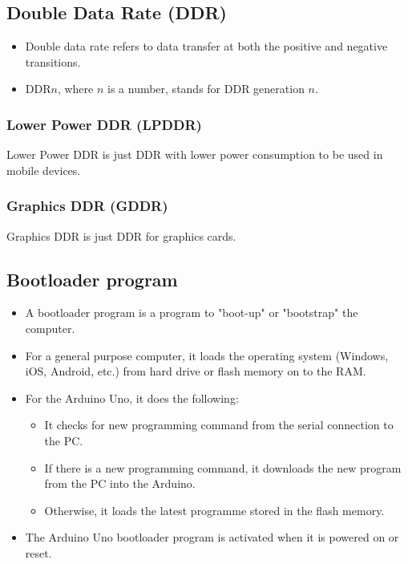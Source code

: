 \documentclass[11pt]{article}
\begin{document}
\subsection{Double Data Rate (DDR)}
\label{sec:org00e4ebd}
\begin{itemize}
\item Double data rate refers to data transfer at both the positive and negative transitions.
\item DDR\(n\), where \(n\) is a number, stands for DDR generation \(n\).
\end{itemize}

\subsubsection{Lower Power DDR (LPDDR)}
\label{sec:org096c0db}
Lower Power DDR is just DDR with lower power consumption to be used in mobile devices.

\subsubsection{Graphics DDR (GDDR)}
\label{sec:orgfc76842}
Graphics DDR is just DDR for graphics cards.

\subsection{Bootloader program}
\label{sec:org1b30d09}
\begin{itemize}
\item A bootloader program is a program to "boot-up" or "bootstrap" the computer.
\item For a general purpose computer, it loads the operating system (Windows, iOS, Android, etc.) from hard drive or flash memory on to the RAM.
\item For the Arduino Uno, it does the following:
\begin{itemize}
\item It checks for new programming command from the serial connection to the PC.
\item If there is a new programming command, it downloads the new program from the PC into the Arduino.
\item Otherwise, it loads the latest programme stored in the flash memory.
\end{itemize}
\item The Arduino Uno bootloader program is activated when it is powered on or reset.
\end{itemize}
\end{document}
